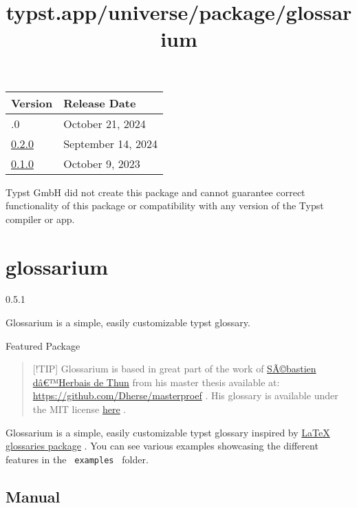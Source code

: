 \begin{longtable}[]{@{}ll@{}}
\toprule\noalign{}
Version & Release Date \\
\midrule\noalign{}
\endhead
\bottomrule\noalign{}
\endlastfoot
0.3.0 & October 21, 2024 \\
\href{https://typst.app/universe/package/outrageous/0.2.0/}{0.2.0} &
September 14, 2024 \\
\href{https://typst.app/universe/package/outrageous/0.1.0/}{0.1.0} &
October 9, 2023 \\
\end{longtable}

Typst GmbH did not create this package and cannot guarantee correct
functionality of this package or compatibility with any version of the
Typst compiler or app.


\title{typst.app/universe/package/glossarium}

\label{banner}
\section{glossarium}\label{glossarium}

{ 0.5.1 }

Glossarium is a simple, easily customizable typst glossary.

{ } Featured Package

\label{readme}
\begin{quote}
{[}!TIP{]} Glossarium is based in great part of the work of
\href{https://github.com/Dherse}{SÃ©bastien dâ€™Herbais de Thun} from
his master thesis available at:
\url{https://github.com/Dherse/masterproef} . His glossary is available
under the MIT license
\href{https://github.com/Dherse/masterproef/blob/main/elems/acronyms.typ}{here}
.
\end{quote}

Glossarium is a simple, easily customizable typst glossary inspired by
\href{https://www.ctan.org/pkg/glossaries}{LaTeX glossaries package} .
You can see various examples showcasing the different features in the
\texttt{\ examples\ } folder.


\subsection{Manual}\label{manual}

